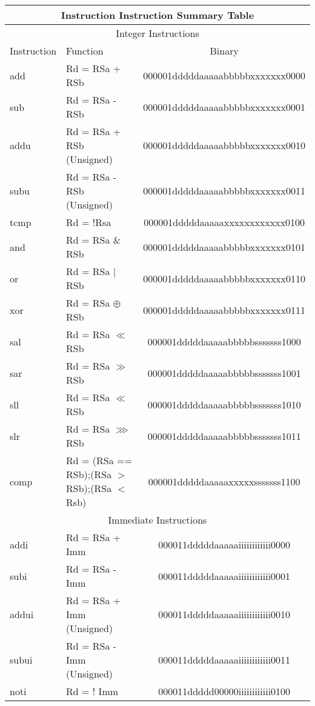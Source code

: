 \documentclass[letterpaper, 11pt]{article}
\begin{document}
	\begin{center}
		\begin{longtable}{|l|l|c|}
			\multicolumn{3}{c}{Instruction Instruction Summary Table} \\ \hline
			\multicolumn{3}{|c|}{Integer Instructions} \\ \hline
			Instruction & Function 										& Binary \\ \hline
			add			& Rd = RSa + RSb 								& 000001dddddaaaaabbbbbxxxxxxx0000 \\
			sub			& Rd = RSa - RSb 								& 000001dddddaaaaabbbbbxxxxxxx0001 \\
			addu		& Rd = RSa + RSb (Unsigned) 					& 000001dddddaaaaabbbbbxxxxxxx0010 \\
			subu		& Rd = RSa - RSb (Unsigned)					 	& 000001dddddaaaaabbbbbxxxxxxx0011 \\
			tcmp		& Rd = !Rsa	 									& 000001dddddaaaaaxxxxxxxxxxxx0100 \\
			and			& Rd = RSa \& RSb								& 000001dddddaaaaabbbbbxxxxxxx0101 \\
			or			& Rd = RSa $|$ RSb 								& 000001dddddaaaaabbbbbxxxxxxx0110 \\
			xor			& Rd = RSa $\oplus$ RSb 						& 000001dddddaaaaabbbbbxxxxxxx0111 \\
			sal			& Rd = RSa $\ll$ RSb 							& 000001dddddaaaaabbbbbsssssss1000 \\
			sar			& Rd = RSa $\gg$ RSb 							& 000001dddddaaaaabbbbbsssssss1001 \\
			sll			& Rd = RSa $\ll$ RSb 							& 000001dddddaaaaabbbbbsssssss1010 \\
			slr			& Rd = RSa $ \ggg  $ RSb 						& 000001dddddaaaaabbbbbsssssss1011 \\
			comp		& Rd = (RSa == RSb);(RSa $>$ RSb);(RSa $<$ Rsb)	& 000001dddddaaaaaxxxxxsssssss1100 \\
			\hline
			\multicolumn{3}{|c|}{Immediate Instructions} \\ \hline
			addi		& Rd = RSa + Imm 								& 000011dddddaaaaaiiiiiiiiiiii0000 \\
			subi		& Rd = RSa - Imm 								& 000011dddddaaaaaiiiiiiiiiiii0001 \\
			addui		& Rd = RSa + Imm (Unsigned)						& 000011dddddaaaaaiiiiiiiiiiii0010 \\
			subui		& Rd = RSa - Imm (Unsigned)					 	& 000011dddddaaaaaiiiiiiiiiiii0011 \\
			noti		& Rd = ! Imm									& 000011ddddd00000iiiiiiiiiiii0100 \\

\end{longtable}
\end{center}
\end{document}
